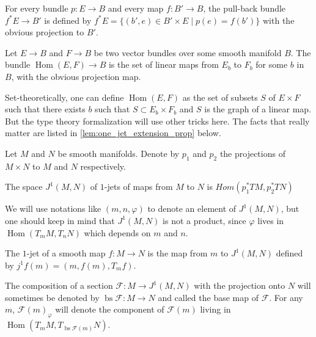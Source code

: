 \documentclass[10pt,a4paper]{article}
\newcommand{\co}{\!:}
\DeclareMathOperator{\Hom}{Hom}
\newcommand{\F}{\mathcal{F}} %
\DeclareMathOperator{\bs}{bs} %
\newcommand{\uses}[1]{}
\newcommand{\lean}[1]{}
\newcommand{\leanok}{}
\begin{document}
\begin{definition}
\label{def:pull_back_bundle}
\leanok
\lean{Bundle.Pullback}
For every bundle $p : E → B$ and every map $f \co B' → B$,
the pull-back bundle $f^*E → B'$ is defined by
$f^*E = \{(b', e) ∈ B' × E \;|\; p(e) = f(b')\}$ with
the obvious projection to $B'$.
\end{definition}

\begin{definition}
\label{def:hom_bundle}
\leanok
\lean{Bundle.ContinuousLinearMap.vectorBundle}
Let $E → B$ and $F → B$ be two vector bundles over some smooth manifold
$B$. The bundle $\Hom(E, F) → B$ is the set of linear maps from
$E_b$ to $F_b$ for some $b$ in $B$, with the obvious projection map.
\end{definition}

Set-theoretically, one can define $\Hom(E, F)$ as the set of subsets
$S$ of $E × F$ such that there exists $b$ such that $S ⊂ E_b × F_b$
and $S$ is the graph of a linear map. But the type theory formalization
will use other tricks here. The facts that really matter are listed in
\cref{lem:one_jet_extension_prop} below.

\begin{definition}
\label{def:one_jet_space}
\leanok
\lean{OneJetBundle}
\uses{def:pull_back_bundle, def:hom_bundle}
Let $M$ and $N$ be smooth manifolds. Denote by
$p_1$ and $p_2$ the projections of $M × N$ to
$M$ and $N$ respectively.

The space $J^1(M, N)$ of $1$-jets of maps from $M$ to $N$ is
$Hom(p_1^*TM, p_2^*TN)$
\end{definition}

We will use notations like $(m, n, φ)$ to denote an element
of $J^1(M, N)$,
but one should keep in mind that $J^1(M, N)$ is not a product,
since $φ$ lives in $\Hom(T_mM, T_nN)$ which depends on $m$ and $n$.


\begin{definition}
\label{def:one_jet_extension}
\uses{def:one_jet_space}
\leanok
\lean{oneJetExt}
The $1$-jet of a smooth map $f \co M → N$ is the map from
$m$ to $J^1(M, N)$ defined by $j^1f(m) = (m, f(m), T_mf)$.
\end{definition}

The composition of a section $\F \co M → J^1(M, N)$ with the projection
onto $N$ will sometimes be denoted by $\bs \F \co M → N$ and called the
base map of $\F$. For any $m$, $\F(m)_φ$ will denote the component of $\F(m)$
living in $\Hom(T_mM, T_{\bs\F(m)}N)$.
\end{document}
